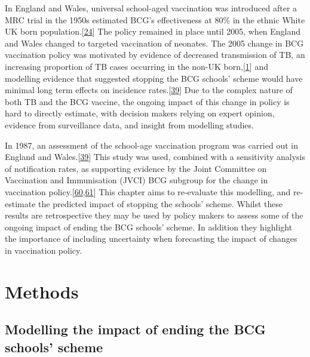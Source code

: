 \documentclass[11pt,twoside]{bristolthesis}
\begin{document}
  In England and Wales, universal school-aged vaccination was introduced after a MRC trial in the 1950s estimated BCG's effectiveness at 80\% in the ethnic White UK born population.{[}\protect\hyperlink{ref-Hart1972}{24}{]} The policy remained in place until 2005, when England and Wales changed to targeted vaccination of neonates. The 2005 change in BCG vaccination policy was motivated by evidence of decreased transmission of TB, an increasing proportion of TB cases occurring in the non-UK born,{[}\protect\hyperlink{ref-PHE2017}{1}{]} and modelling evidence that suggested stopping the BCG schools' scheme would have minimal long term effects on incidence rates.{[}\protect\hyperlink{ref-Sutherland1989}{39}{]} Due to the complex nature of both TB and the BCG vaccine, the ongoing impact of this change in policy is hard to directly estimate, with decision makers relying on expert opinion, evidence from surveillance data, and insight from modelling studies.
  
  In 1987, an assessment of the school-age vaccination program was carried out in England and Wales.{[}\protect\hyperlink{ref-Sutherland1989}{39}{]} This study was used, combined with a sensitivity analysis of notification rates, as supporting evidence by the Joint Committee on Vaccination and Immunisation (JVCI) BCG subgroup for the change in vaccination policy.{[}\protect\hyperlink{ref-JVCIBCG2002}{60},\protect\hyperlink{ref-JVCIBCG2003}{61}{]} This chapter aims to re-evaluate this modelling, and re-estimate the predicted impact of stopping the schools' scheme. Whilst these results are retrospective they may be used by policy makers to assess some of the ongoing impact of ending the BCG schools' scheme. In addition they highlight the importance of including uncertainty when forecasting the impact of changes in vaccination policy.
  
  \hypertarget{methods}{%
  \section{Methods}\label{methods}}
  
  \hypertarget{modelling-the-impact-of-ending-the-bcg-schools-scheme}{%
  \subsection{Modelling the impact of ending the BCG schools' scheme}\label{modelling-the-impact-of-ending-the-bcg-schools-scheme}}
  
\end{document}
